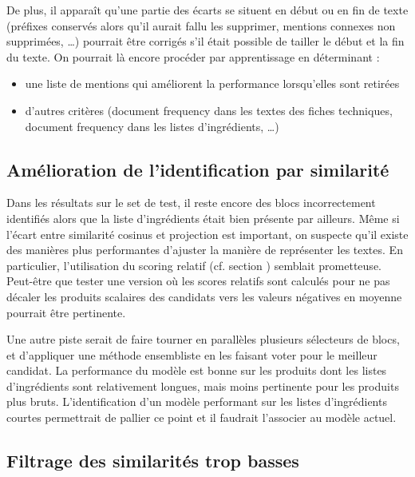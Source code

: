     De plus, il apparaît qu'une partie des écarts se situent en début ou en fin de texte (préfixes conservés alors qu'il aurait fallu les supprimer, mentions connexes non supprimées, \dots)
    pourrait être corrigés s'il était possible de \og tailler \fg le début et la fin du texte.
    On pourrait là encore procéder par apprentissage en déterminant : 
    \begin{itemize}
        \item une liste de mentions qui améliorent la performance lorsqu'elles sont retirées
        \item d'autres critères (document frequency dans les textes des fiches techniques, document frequency dans les listes d'ingrédients, \dots)
    \end{itemize}

    \subsection{Amélioration de l'identification par similarité}

    Dans les résultats sur le set de test, il reste encore des blocs incorrectement identifiés alors que la liste d'ingrédients était bien présente par ailleurs.
    Même si l'écart entre similarité cosinus et projection est important, on suspecte qu'il existe des manières plus performantes d'ajuster la manière de représenter les textes.
    En particulier, l'utilisation du scoring relatif (cf. section ) semblait prometteuse.
    Peut-être que tester une version où les scores relatifs sont calculés pour ne pas décaler les produits scalaires des candidats vers les valeurs négatives en moyenne pourrait être pertinente.

    Une autre piste serait de faire tourner en parallèles plusieurs sélecteurs de blocs, et d'appliquer une méthode ensembliste en les faisant voter pour le meilleur candidat.
    La performance du modèle est bonne sur les produits dont les listes d'ingrédients sont relativement longues, mais moins pertinente pour les produits plus bruts.
    L'identification d'un modèle performant sur les listes d'ingrédients courtes permettrait de pallier ce point et il faudrait l'associer au modèle actuel.

    \subsection{Filtrage des similarités trop basses}
    
